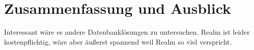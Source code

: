 \chapter{\label{chap:fazit}Zusammenfassung und Ausblick}
Interessant wäre es andere Datenbanklösungen zu untersuchen.
Realm ist leider kostenpflichtig, wäre aber äußerst spannend weil Realm so viel verspricht.